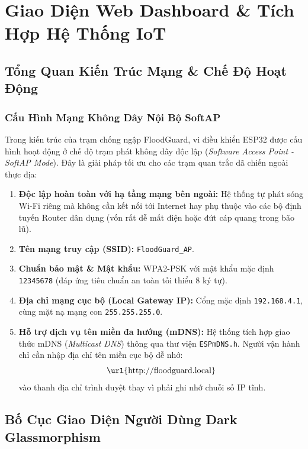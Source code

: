 \chapter{Giao Diện Web Dashboard \& Tích Hợp Hệ Thống IoT}
\label{ch:web_dashboard}

\section{Tổng Quan Kiến Trúc Mạng \& Chế Độ Hoạt Động}

\subsection{Cấu Hình Mạng Không Dây Nội Bộ SoftAP}
Trong kiến trúc của trạm chống ngập FloodGuard, vi điều khiển ESP32 được cấu hình hoạt động ở chế độ trạm phát không dây độc lập (\textit{Software Access Point - SoftAP Mode}). Đây là giải pháp tối ưu cho các trạm quan trắc dã chiến ngoài thực địa:
\begin{enumerate}
    \item \textbf{Độc lập hoàn toàn với hạ tầng mạng bên ngoài:} Hệ thống tự phát sóng Wi-Fi riêng mà không cần kết nối tới Internet hay phụ thuộc vào các bộ định tuyến Router dân dụng (vốn rất dễ mất điện hoặc đứt cáp quang trong bão lũ).
    \item \textbf{Tên mạng truy cập (SSID):} \texttt{FloodGuard\_AP}.
    \item \textbf{Chuẩn bảo mật \& Mật khẩu:} WPA2-PSK với mật khẩu mặc định \texttt{12345678} (đáp ứng tiêu chuẩn an toàn tối thiểu 8 ký tự).
    \item \textbf{Địa chỉ mạng cục bộ (Local Gateway IP):} Cổng mặc định \texttt{192.168.4.1}, cùng mặt nạ mạng con \texttt{255.255.255.0}.
    \item \textbf{Hỗ trợ dịch vụ tên miền đa hướng (mDNS):} Hệ thống tích hợp giao thức mDNS (\textit{Multicast DNS}) thông qua thư viện \texttt{ESPmDNS.h}. Người vận hành chỉ cần nhập địa chỉ tên miền cục bộ dễ nhớ:
    \begin{equation}
        \text{\url{http://floodguard.local}}
    \end{equation}
    vào thanh địa chỉ trình duyệt thay vì phải ghi nhớ chuỗi số IP tĩnh.
\end{enumerate}

\section{Bố Cục Giao Diện Người Dùng Dark Glassmorphism}


